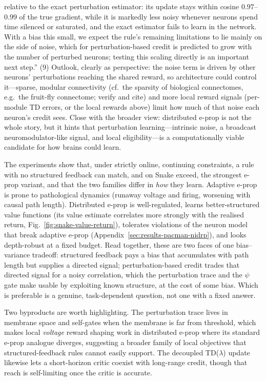\documentclass[10pt,twocolumn]{article}
\begin{document}
{relative to the exact perturbation estimator: its update stays within cosine
$0.97$--$0.99$ of the true gradient, while it is markedly less noisy whenever
neurons spend time silenced or saturated, and the exact estimator fails to
learn in the network. With a bias this small, we expect the rule's remaining
limitations to lie mainly on the side of noise, which for perturbation-based
credit is predicted to grow with the number of perturbed neurons; testing this
scaling directly is an important next step.'' (9) Outlook, clearly as
perspective: the noise term is driven by other neurons' perturbations reaching
the shared reward, so architecture could control it---sparse, modular
connectivity (cf.\ the sparsity of biological connectomes, e.g.\ the fruit-fly
connectome; verify and cite) and more local reward signals (per-module TD
errors, or the local rewards above) limit how much of that noise each neuron's
credit sees. Close with the broader view: distributed e-prop is not the whole
story, but it hints that perturbation learning---intrinsic noise, a broadcast
neuromodulator-like signal, and local eligibility---is a computationally
viable candidate for how brains could learn.}

The experiments show that, under strictly online, continuing constraints, a
rule with no structured feedback can match, and on Snake exceed, the strongest
e-prop variant, and that the two families differ in \emph{how} they learn. Adaptive e-prop is prone to pathological dynamics
(runaway voltage and firing, worsening with causal path length).
Distributed e-prop is well-regulated, learns better-structured value functions
(its value estimate correlates more strongly with the realised return,
Fig.~\ref{fig:snake-value-return}),
tolerates violations of the neuron model that break adaptive e-prop
(Appendix~\ref{sec:results-pacman-nidrp}), and looks
depth-robust at a fixed budget. Read together, these are two faces of one
bias--variance tradeoff: structured feedback pays a bias that accumulates with
path length but supplies a directed signal; perturbation-based credit trades
that directed signal for a noisy correlation, which the perturbation trace and
the $\psi$ gate make usable by exploiting known structure, at the cost of some
bias. Which is preferable is a genuine, task-dependent
question, not one with a fixed answer.

Two byproducts are worth highlighting. The perturbation trace lives in membrane
space and self-gates when the membrane is far from threshold, which makes local
\emph{voltage} reward shaping work in distributed e-prop where its standard
e-prop analogue diverges, suggesting a broader family of local objectives that
structured-feedback rules cannot easily support. The decoupled TD($\lambda$)
update likewise lets a short-horizon critic coexist with long-range credit,
though that reach is self-limiting once the critic is accurate.
\end{document}
